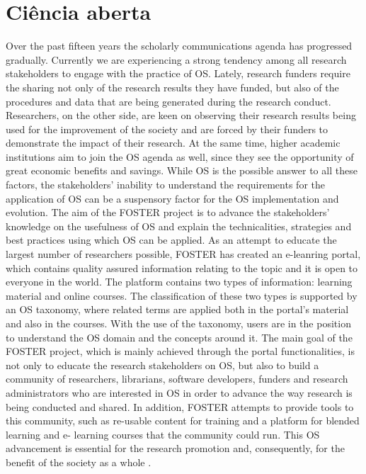 \section{Ciência aberta}

Over the past fifteen years the scholarly communications agenda
has progressed gradually. Currently we are experiencing a strong
tendency among all research stakeholders to engage with the
practice of OS. Lately, research funders require the sharing not
only of the research results they have funded, but also of the
procedures and data that are being generated during the research
conduct. Researchers, on the other side, are keen on observing
their research results being used for the improvement of the
society and are forced by their funders to demonstrate the impact
of their research. At the same time, higher academic institutions
aim to join the OS agenda as well, since they see the opportunity
of great economic benefits and savings. While OS is the possible
answer to all these factors, the stakeholders’ inability to
understand the requirements for the application of OS can be a
suspensory factor for the OS implementation and evolution.
The aim of the FOSTER project is to advance the stakeholders'
knowledge on the usefulness of OS and explain the technicalities,
strategies and best practices using which OS can be applied. As an
attempt to educate the largest number of researchers possible,
FOSTER has created an e-leanring portal, which contains quality
assured information relating to the topic and it is open to everyone
in the world. The platform contains two types of information:
learning material and online courses. The classification of these
two types is supported by an OS taxonomy, where related terms
are applied both in the portal's material and also in the courses.
With the use of the taxonomy, users are in the position to
understand the OS domain and the concepts around it.
The main goal of the FOSTER project, which is mainly achieved
through the portal functionalities, is not only to educate the
research stakeholders on OS, but also to build a community of
researchers, librarians, software developers, funders and research
administrators who are interested in OS in order to advance the
way research is being conducted and shared. In addition, FOSTER
attempts to provide tools to this community, such as re-usable
content for training and a platform for blended learning and e-
learning courses that the community could run. This OS
advancement is essential for the research promotion and,
consequently, for the benefit of the society as a whole
\cite{Nancy2015}.

